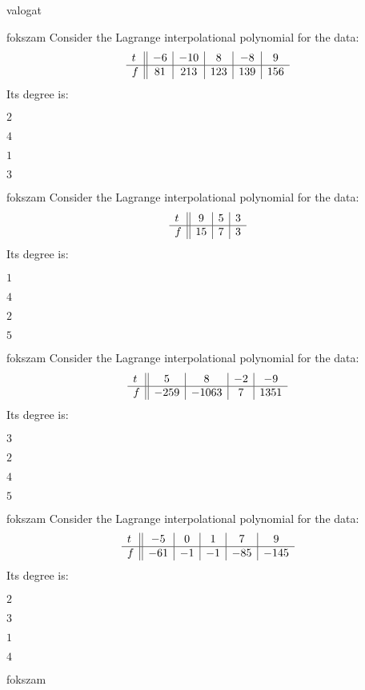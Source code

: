 \documentclass[12pt]{article}
\begin{document}
\begin{quiz}{valogat}
\begin{multi}{fokszam}
Consider the Lagrange interpolational polynomial for the data:
$$\begin{array}{l ||c|c|c|c|c}t&-6&-10&8&-8&9\\ \hline f&81&213&123&139&156 \\ \end{array}$$
Its degree is:
\item* $ 2 $
\item  $ 4 $
\item  $ 1 $
\item  $ 3 $
\end{multi}
\begin{multi}{fokszam}
Consider the Lagrange interpolational polynomial for the data:
$$\begin{array}{l ||c|c|c}t&9&5&3\\ \hline f&15&7&3 \\ \end{array}$$
Its degree is:
\item* $ 1 $
\item  $ 4 $
\item  $ 2 $
\item  $ 5 $
\end{multi}
\begin{multi}{fokszam}
Consider the Lagrange interpolational polynomial for the data:
$$\begin{array}{l ||c|c|c|c}t&5&8&-2&-9\\ \hline f&-259&-1063&7&1351 \\ \end{array}$$
Its degree is:
\item* $ 3 $
\item  $ 2 $
\item  $ 4 $
\item  $ 5 $
\end{multi}
\begin{multi}{fokszam}
Consider the Lagrange interpolational polynomial for the data:
$$\begin{array}{l ||c|c|c|c|c}t&-5&0&1&7&9\\ \hline f&-61&-1&-1&-85&-145 \\ \end{array}$$
Its degree is:
\item* $ 2 $
\item  $ 3 $
\item  $ 1 $
\item  $ 4 $
\end{multi}
\begin{multi}{fokszam}

\end{multi}
\end{quiz}
\end{document}
